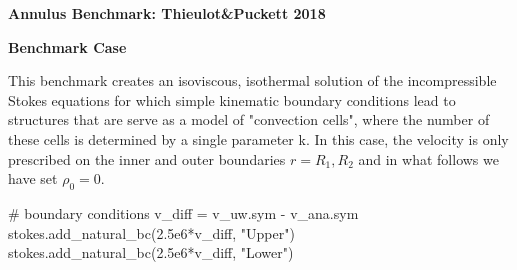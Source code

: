 \documentclass[12pt]{article}
\numberwithin{equation}{subsection}
\begin{document}
 

\cleardoublepage
{}
\recalctypearea
{}

\eject \pdfpagewidth=11.4in \pdfpageheight=10.8in 

\newpage

\vspace{1.5in} 

\begin{adjustwidth}{10cm}{1cm}
	\vspace{5.5in}  
	\textbf{Annulus Benchmark: Thieulot\&Puckett 2018}
\end{adjustwidth}

\newpage

\textbf{Benchmark Case}
\vspace{0.2in}

\begin{adjustwidth}{1cm}{5cm}
	\hspace{0.2in} This benchmark creates an isoviscous, isothermal solution of the incompressible Stokes
	equations for which simple kinematic boundary conditions lead to structures that are 
	serve as a model of "convection cells", where the number of these cells is determined
	by a single parameter k. In this case, the velocity is only prescribed on the inner and 
	outer boundaries  $r = R_{1}, R_{2}$ and in what follows we have set $\rho_{0} = 0$.
\end{adjustwidth}

\vspace{0.2in}

\begin{adjustwidth}{1cm}{5cm}
	\begin{python}
		# boundary conditions
		v_diff =  v_uw.sym - v_ana.sym
		stokes.add_natural_bc(2.5e6*v_diff, "Upper")
		stokes.add_natural_bc(2.5e6*v_diff, "Lower")
	\end{python}
\end{adjustwidth}


%	
%	
\end{document}

